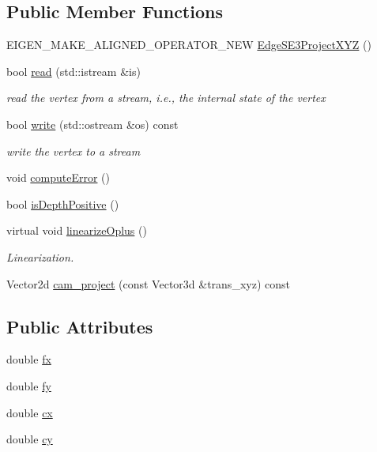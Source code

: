 \subsection*{Public Member Functions}
\begin{DoxyCompactItemize}
\item 
E\+I\+G\+E\+N\+\_\+\+M\+A\+K\+E\+\_\+\+A\+L\+I\+G\+N\+E\+D\+\_\+\+O\+P\+E\+R\+A\+T\+O\+R\+\_\+\+N\+EW \mbox{\hyperlink{classg2o_1_1_edge_s_e3_project_x_y_z_acdf6cb451767e46e7bbd6a180782feb8}{Edge\+S\+E3\+Project\+X\+YZ}} ()
\item 
bool \mbox{\hyperlink{classg2o_1_1_edge_s_e3_project_x_y_z_a04200f3d6b7fbd47961df696f1ee34ed}{read}} (std\+::istream \&is)
\begin{DoxyCompactList}\small\item\em read the vertex from a stream, i.\+e., the internal state of the vertex \end{DoxyCompactList}\item 
bool \mbox{\hyperlink{classg2o_1_1_edge_s_e3_project_x_y_z_ad2c5fe36901961700eaa9f38cc4b21ca}{write}} (std\+::ostream \&os) const
\begin{DoxyCompactList}\small\item\em write the vertex to a stream \end{DoxyCompactList}\item 
void \mbox{\hyperlink{classg2o_1_1_edge_s_e3_project_x_y_z_a79a763e1d42fe9eb5732abe59c7723d9}{compute\+Error}} ()
\item 
bool \mbox{\hyperlink{classg2o_1_1_edge_s_e3_project_x_y_z_a603cc0018b5b05fd193e84e032a66d07}{is\+Depth\+Positive}} ()
\item 
virtual void \mbox{\hyperlink{classg2o_1_1_edge_s_e3_project_x_y_z_a7454e89740635d782c9e4efaef35ec44}{linearize\+Oplus}} ()
\begin{DoxyCompactList}\small\item\em Linearization. \end{DoxyCompactList}\item 
Vector2d \mbox{\hyperlink{classg2o_1_1_edge_s_e3_project_x_y_z_ab6d57a3a8bbeafb3405ea39c98dca768}{cam\+\_\+project}} (const Vector3d \&trans\+\_\+xyz) const
\end{DoxyCompactItemize}
\subsection*{Public Attributes}
\begin{DoxyCompactItemize}
\item 
double \mbox{\hyperlink{classg2o_1_1_edge_s_e3_project_x_y_z_a6af0a48bd4e21d060585d7ee9c1ca1ef}{fx}}
\item 
double \mbox{\hyperlink{classg2o_1_1_edge_s_e3_project_x_y_z_af5f931cd13ef318a3f42f54aa57b9466}{fy}}
\item 
double \mbox{\hyperlink{classg2o_1_1_edge_s_e3_project_x_y_z_ace052104b07ec272eb5f254254ead5e5}{cx}}
\item 
double \mbox{\hyperlink{classg2o_1_1_edge_s_e3_project_x_y_z_af590c37d535ce7e71be5ce4ae368e9c1}{cy}}
\end{DoxyCompactItemize}
